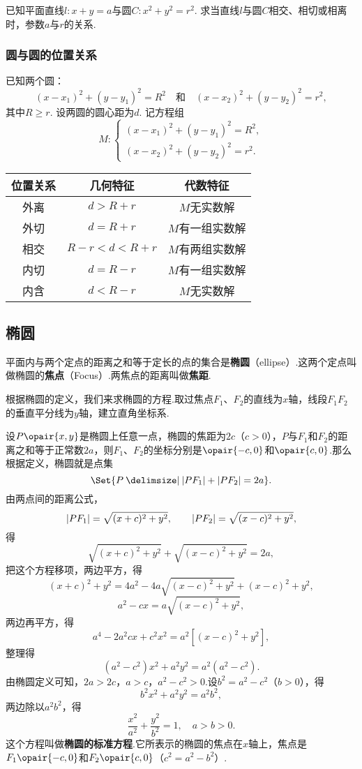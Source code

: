 \begin{example}
已知平面直线\(l: x + y = a\)与圆\(C: x^2 + y^2 = r^2\).
求当直线\(l\)与圆\(C\)相交、相切或相离时，参数\(a\)与\(r\)的关系.
\end{example}

\subsubsection{圆与圆的位置关系}
已知两个圆：\[
(x-x_1)^2+(y-y_1)^2=R^2
\quad\text{和}\quad
(x-x_2)^2+(y-y_2)^2=r^2,
\]其中\(R \geqslant r\).
设两圆的圆心距为\(d\).
记方程组\[
M: \begin{cases}
(x-x_1)^2+(y-y_1)^2=R^2, \\
(x-x_2)^2+(y-y_2)^2=r^2.
\end{cases}
\]
\begin{center}
\begin{tabular}{|*3{c|}}
\hline
位置关系 & 几何特征 & 代数特征 \\ \hline
外离 & \(d>R+r\) & \(M\)无实数解 \\
外切 & \(d=R+r\) & \(M\)有一组实数解 \\
相交 & \(R-r<d<R+r\) & \(M\)有两组实数解 \\
内切 & \(d=R-r\) & \(M\)有一组实数解 \\
内含 & \(d<R-r\) & \(M\)无实数解 \\
\hline
\end{tabular}
\end{center}

\subsection{椭圆}
\begin{definition}
平面内与两个定点的距离之和等于定长的点的集合是\textbf{椭圆}（ellipse）.这两个定点叫做椭圆的\textbf{焦点}（Focus）.两焦点的距离叫做\textbf{焦距}.
\end{definition}

根据椭圆的定义，我们来求椭圆的方程.取过焦点\(F_1\)、\(F_2\)的直线为\(x\)轴，线段\(F_1 F_2\)的垂直平分线为\(y\)轴，建立直角坐标系.

设\(P\opair{x,y}\)是椭圆上任意一点，椭圆的焦距为\(2c\)（\(c > 0\)），\(P\)与\(F_1\)和\(F_2\)的距离之和等于正常数\(2a\)，则\(F_1\)、\(F_2\)的坐标分别是\(\opair{-c,0}\)和\(\opair{c,0}\).那么根据定义，椭圆就是点集\[
\Set{ P \given \abs{P F_1} + \abs{P F_2} = 2a }.
\]由两点间的距离公式，\[
\abs{P F_1} = \sqrt{(x+c)^2+y^2},
\qquad
\abs{P F_2} = \sqrt{(x-c)^2+y^2},
\]得\[
\sqrt{(x+c)^2+y^2} + \sqrt{(x-c)^2+y^2} = 2a,
\]把这个方程移项，两边平方，得\[
(x+c)^2+y^2 = 4a^2 - 4a\sqrt{(x-c)^2+y^2} + (x-c)^2+y^2,
\]\[
a^2 - cx = a\sqrt{(x-c)^2+y^2},
\]两边再平方，得\[
a^4 - 2 a^2 cx + c^2 x^2 = a^2 [(x-c)^2+y^2],
\]整理得\[
(a^2 - c^2) x^2 + a^2 y^2 = a^2 (a^2 - c^2).
\]由椭圆定义可知，\(2a > 2c\)，\(a > c\)，\(a^2 - c^2 > 0\).设\(b^2 = a^2 - c^2\)（\(b > 0\)），得\[
b^2 x^2 + a^2 y^2 = a^2 b^2,
\]两边除以\(a^2 b^2\)，得\begin{equation}
\frac{x^2}{a^2} + \frac{y^2}{b^2} = 1,
\quad a > b > 0.
\end{equation}
这个方程叫做\textbf{椭圆的标准方程}.它所表示的椭圆的焦点在\(x\)轴上，焦点是\(F_1\opair{-c,0}\)和\(F_2\opair{c,0}\)（\(c^2 = a^2 - b^2\)）.

